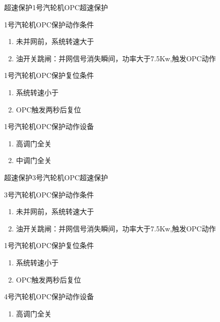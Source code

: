 \documentclass[12pt,hyperref={CJKbookmarks=true}]{beamer} %
\begin{document}
\begin{frame}{超速保护}{1号汽轮机OPC超速保护}
\begin{block}{\heiti 1号汽轮机OPC保护动作条件}
			\begin{enumerate}
				\item 未并网前，系统转速大于
				\item 油开关跳闸：并网信号消失瞬间，功率大于7.5Kw,触发OPC动作
		\end{enumerate}
		\end{block}
\begin{block}{\heiti 1号汽轮机OPC保护复位条件}
			\begin{enumerate}
				\item 系统转速小于
				\item OPC触发两秒后复位
		\end{enumerate}
		\end{block}
\begin{block}{\heiti 1号汽轮机OPC保护动作设备}
			\begin{enumerate}
				\item 高调门全关
				\item 中调门全关
		\end{enumerate}
		\end{block}
\end{frame}
\begin{frame}{超速保护}{3号汽轮机OPC超速保护}
\begin{block}{\heiti 3号汽轮机OPC保护动作条件}
			\begin{enumerate}
				\item 未并网前，系统转速大于
				\item 油开关跳闸：并网信号消失瞬间，功率大于7.5Kw,触发OPC动作
		\end{enumerate}
		\end{block}
\begin{block}{\heiti 1号汽轮机OPC保护复位条件}
			\begin{enumerate}
				\item 系统转速小于
				\item OPC触发两秒后复位
		\end{enumerate}
		\end{block}
\begin{block}{\heiti 4号汽轮机OPC保护动作设备}
			\begin{enumerate}
				\item 高调门全关
		\end{enumerate}
		\end{block}
\end{frame}
\end{document}
